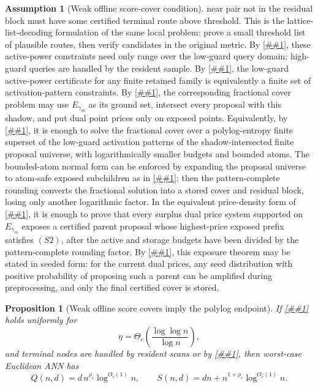 \documentclass[10pt]{article}
\newcommand{\cref}[1]{\ref{##1}}
\newtheorem{proposition}[theorem]{Proposition}
\theoremstyle{definition}
\newtheorem{assumption}[theorem]{Assumption}
\begin{document}
\begin{assumption}[Weak offline score-cover condition]
   near pair not in the residual block must have some certified terminal route
   above threshold.  This is the lattice-list-decoding formulation of the same
   local problem: prove a small threshold list of plausible routes, then verify
   candidates in the original metric.
   By \cref{lem:guard-restricted-cover}, these active-power constraints need
   only range over the low-guard query domain; high-guard queries are handled by
   the resident sample.  By \cref{lem:finite-activation-patterns}, the
   low-guard active-power certificate for any finite retained family is
   equivalently a finite set of activation-pattern constraints.  By
   \cref{cor:shadow-finite-pool-dual}, the corresponding fractional cover
   problem may use $E_{\gamma_m}$ as its ground set, intersect every proposal
   with this shadow, and put dual point prices only on exposed points.
   Equivalently, by \cref{lem:pattern-complete-cover}, it is enough to solve
   the fractional cover over a polylog-entropy finite superset of the low-guard
   activation patterns of the shadow-intersected finite proposal universe, with
   logarithmically smaller budgets and bounded atoms.  The bounded-atom normal
   form can be enforced by expanding the proposal universe to atom-safe exposed
   subchildren as in \cref{lem:atom-safe-subchild}; then the pattern-complete
   rounding converts the fractional solution into a stored cover and residual
   block, losing only another logarithmic factor.  In the equivalent
   price-density form of \cref{lem:shadow-price-density-compiler}, it is enough
   to prove that every surplus dual price system supported on $E_{\gamma_m}$
   exposes a certified parent proposal whose highest-price exposed prefix
   satisfies \((S2)\), after the active and storage budgets have been divided by
   the pattern-complete rounding factor.  By
   \cref{cor:seeded-shadow-separation}, this exposure theorem may be stated in
   seeded form: for the current dual prices, any seed distribution with positive
   probability of proposing such a parent can be amplified during preprocessing,
   and only the final certified cover is stored.
\end{assumption}

\begin{proposition}[Weak offline score covers imply the polylog endpoint]
   \label{prop:weak-offline-score-cover-polylog}
   If \cref{asm:weak-offline-score-cover} holds uniformly for
   \[
      \eta=\Theta_c\!\left(\frac{\log\log n}{\log n}\right),
   \]
   and terminal nodes are handled by resident scans or by
   \cref{thm:smooth-product-terminal}, then worst-case Euclidean ANN has
   \[
      Q(n,d)=d\,n^{\rho_c}\log^{O_c(1)}n,
      \qquad
      S(n,d)=dn+n^{1+\rho_c}\log^{O_c(1)}n .
   \]
\end{proposition}
\end{document}
